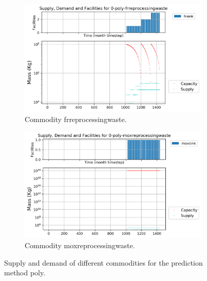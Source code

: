 \documentclass[11pt]{article}
\begin{document}
\begin{figure}[]
	\centering
	\begin{subfigure}[t]{0.45\textwidth}
		\centering
		\includegraphics[width=\linewidth]{23-figures/0-poly-frreprocessingwaste.png} 
		\caption{Commodity frreprocessingwaste.}
		\label{fig:29-frreprocessingwaste}
	\end{subfigure}
	\vspace{1cm}
	\begin{subfigure}[t]{0.45\textwidth}
		\centering
		\includegraphics[width=\linewidth]{29-figures/0-poly-moxreprocessingwaste.png} 
		\caption{Commodity moxreprocessingwaste.}
		\label{fig:29-moxreprocessingwaste}
	\end{subfigure}
	\hfill
	\caption{Supply and demand of different commodities for the prediction method poly.}
	\label{fig:29-waste}
\end{figure}
\end{document}
